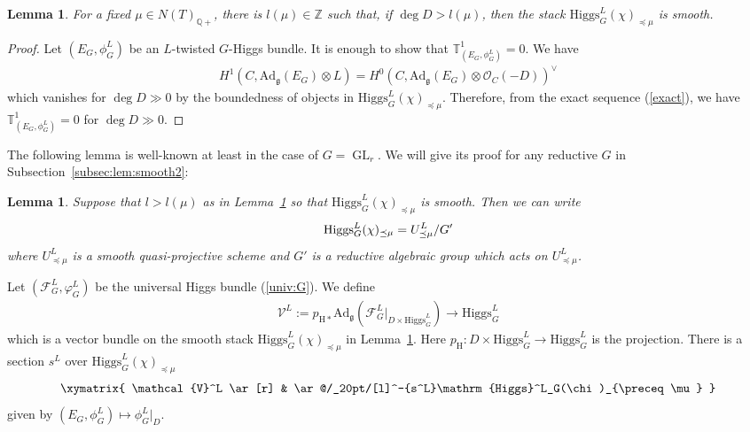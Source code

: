 \documentclass [11pt,oneside,a4paper,mathscr]{amsart}
\newtheorem{lemma}[thm]{Lemma}
\theoremstyle{definition}
\newcommand{\GL}{\operatorname{GL}}
\newcommand{\Ad}{\mathrm{Ad}}
\newcommand{\Hig}{\mathrm{Higgs}}
\begin{document}
\begin{lemma}\label{lem:smooth}
For a fixed $\mu \in N(T)_{\mathbb{Q}+}$, there is $l(\mu)\in \mathbb{Z}$ such that, 
if
$\deg D>l(\mu)$, then   
the stack $\Hig^L_G(\chi)_{\preceq \mu}$ is smooth. 
\end{lemma}
\begin{proof}
Let $(E_G, \phi_G^{L})$ be an $L$-twisted $G$-Higgs bundle. 
It is enough to show that 
$\mathbb{T}^1_{(E_G, \phi_G^{L})}=0$. 
We have 
\begin{align*}
H^1(C, \Ad_{\mathfrak{g}}(E_G)\otimes L) =H^0(C, \Ad_{\mathfrak{g}}(E_G)\otimes\mathcal{O}_C(-D))^{\vee}
\end{align*}
which vanishes for $\deg D\gg 0$ by the boundedness of 
objects in $\Hig_G^{L}(\chi)_{\preceq \mu}$. 
Therefore, from the exact sequence (\ref{exact}),
we have $\mathbb{T}^1_{(E_G, \phi_G^{L})}=0$ for $\deg D \gg 0$. 
\end{proof}

The following lemma is well-known at least in the case of $G=\GL_r$. We will 
give its proof for any reductive $G$ in Subsection~\ref{subsec:lem:smooth2}:
\begin{lemma}\label{lem:smooth2}
Suppose that $l>l(\mu)$ as in Lemma~\ref{lem:smooth} so that 
$\Hig^L_G(\chi)_{\preceq \mu}$ is smooth. Then we can write 
\begin{align}\notag
\Hig^L_G(\chi)_{\preceq \mu}=U_{\preceq \mu}^L/G'
\end{align}
where $U_{\preceq \mu}^L$ is a smooth quasi-projective scheme and $G'$ is a reductive 
algebraic group which acts on $U_{\preceq \mu}^L$. 
\end{lemma}


Let $(\mathscr{F}_G^{L}, \varphi^L_G)$ be the universal 
Higgs bundle (\ref{univ:G}). We define
\begin{align}\label{def:V}
\mathcal{V}^L:=p_{\mathrm{H}\ast}
\Ad_{\mathfrak{g}}(\mathscr{F}_{G}^L|_{D\times \Hig_G^{L}})
\to \Hig^L_G
\end{align}
which is a vector bundle on the smooth stack 
$\Hig^L_G(\chi)_{\preceq \mu}$ in Lemma~\ref{lem:smooth}. 
Here $p_{\mathrm{H}}^{} \colon D \times \Hig^L_G \to \Hig^L_G$ 
is the projection. 
There is a section $s^L$ over $\Hig^L_G(\chi)_{\preceq \mu}$
\begin{align}\label{section:sL}
    \xymatrix{
\mathcal{V}^L \ar[r] & \ar@/_20pt/[l]^-{s^L}\Hig^L_G(\chi)_{\preceq \mu}    
    }
\end{align}
given by $(E_G, \phi_G^{L}) \mapsto \phi_G^{L}|_{D}$.  
\end{document}
